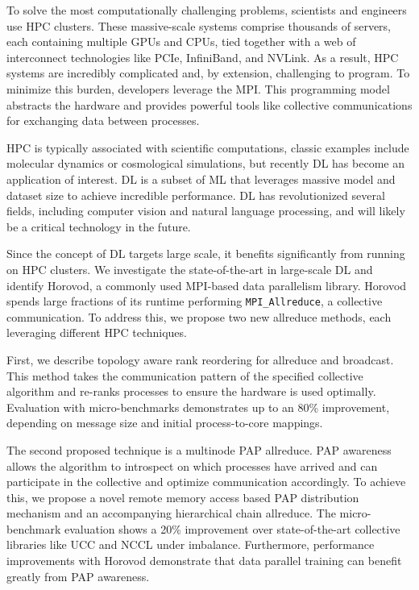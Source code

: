 
To solve the most computationally challenging problems, scientists and engineers use \gls{HPC} clusters. These massive-scale systems comprise thousands of servers, each containing multiple GPUs and CPUs, tied together with a web of interconnect technologies like PCIe, InfiniBand, and NVLink. As a result, \gls{HPC} systems are incredibly complicated and, by extension, challenging to program. To minimize this burden, developers leverage the \gls{MPI}. This programming model abstracts the hardware and provides powerful tools like collective communications for exchanging data between processes.

\gls{HPC} is typically associated with scientific computations, classic examples include molecular dynamics or cosmological simulations, but recently \gls{DL} has become an application of interest. \gls{DL} is a subset of \gls{ML} that leverages massive model and dataset size to achieve incredible performance. \gls{DL} has revolutionized several fields, including computer vision and natural language processing, and will likely be a critical technology in the future. 

Since the concept of \gls{DL} targets large scale, it benefits significantly from running on \gls{HPC} clusters. We investigate the state-of-the-art in large-scale \gls{DL} and identify Horovod, a commonly used \gls{MPI}-based data parallelism library. Horovod spends large fractions of its runtime performing \texttt{MPI\_Allreduce}, a collective communication. To address this, we propose two new allreduce methods, each leveraging different \gls{HPC} techniques. 

First, we describe topology aware rank reordering for allreduce and broadcast.
This method takes the communication pattern of the specified collective algorithm and re-ranks processes to ensure the hardware is used optimally.
Evaluation with micro-benchmarks demonstrates up to an 80\% improvement, depending on message size and initial process-to-core mappings.

The second proposed technique is a multinode \gls{PAP} allreduce. \gls{PAP} awareness allows the algorithm to introspect on which processes have arrived and can participate in the collective and optimize communication accordingly. To achieve this, we propose a novel remote memory access based \gls{PAP} distribution mechanism and an accompanying hierarchical chain allreduce. The micro-benchmark evaluation shows a 20\% improvement over state-of-the-art collective libraries like UCC and NCCL under imbalance. Furthermore, performance improvements with Horovod demonstrate that data parallel training can benefit greatly from \gls{PAP} awareness.